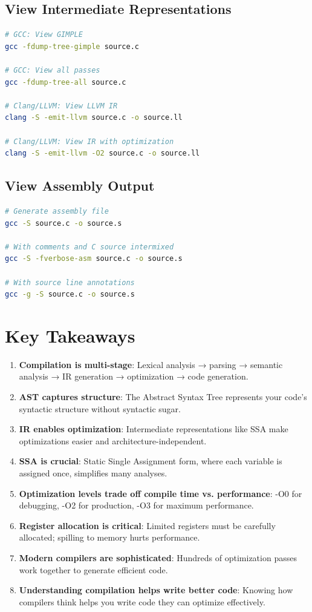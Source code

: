 \subsection{View Intermediate Representations}

\begin{lstlisting}[language=bash]
# GCC: View GIMPLE
gcc -fdump-tree-gimple source.c

# GCC: View all passes
gcc -fdump-tree-all source.c

# Clang/LLVM: View LLVM IR
clang -S -emit-llvm source.c -o source.ll

# Clang/LLVM: View IR with optimization
clang -S -emit-llvm -O2 source.c -o source.ll
\end{lstlisting}

\subsection{View Assembly Output}

\begin{lstlisting}[language=bash]
# Generate assembly file
gcc -S source.c -o source.s

# With comments and C source intermixed
gcc -S -fverbose-asm source.c -o source.s

# With source line annotations
gcc -g -S source.c -o source.s
\end{lstlisting}

\section{Key Takeaways}

\begin{enumerate}
    \item \textbf{Compilation is multi-stage}: Lexical analysis → parsing → semantic analysis → IR generation → optimization → code generation.
    \item \textbf{AST captures structure}: The Abstract Syntax Tree represents your code's syntactic structure without syntactic sugar.
    \item \textbf{IR enables optimization}: Intermediate representations like SSA make optimizations easier and architecture-independent.
    \item \textbf{SSA is crucial}: Static Single Assignment form, where each variable is assigned once, simplifies many analyses.
    \item \textbf{Optimization levels trade off compile time vs. performance}: -O0 for debugging, -O2 for production, -O3 for maximum performance.
    \item \textbf{Register allocation is critical}: Limited registers must be carefully allocated; spilling to memory hurts performance.
    \item \textbf{Modern compilers are sophisticated}: Hundreds of optimization passes work together to generate efficient code.
    \item \textbf{Understanding compilation helps write better code}: Knowing how compilers think helps you write code they can optimize effectively.
\end{enumerate}

